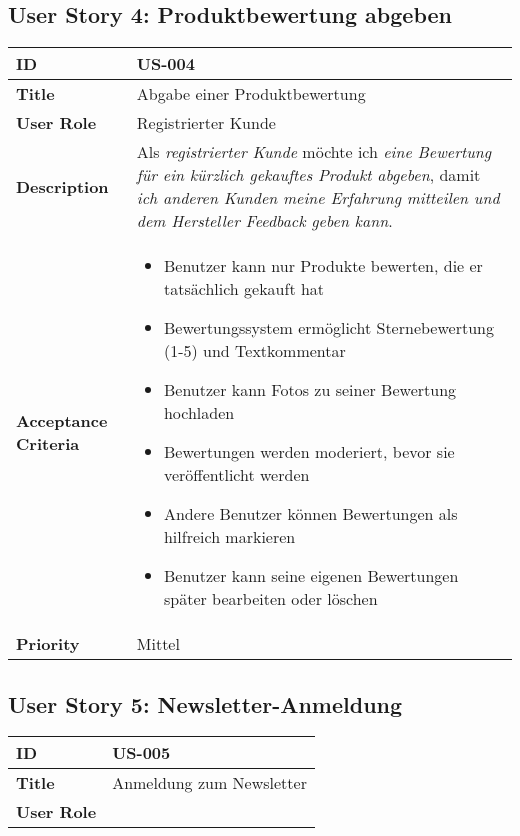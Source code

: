 \documentclass[a4paper,11pt]{article}
\begin{document}
\subsection{User Story 4: Produktbewertung abgeben}
\begin{tabularx}{\textwidth}{|l|X|}
    \hline
    \textbf{ID} & US-004 \\
    \hline
    \textbf{Title} & Abgabe einer Produktbewertung \\
    \hline
    \textbf{User Role} & Registrierter Kunde \\
    \hline
    \textbf{Description} & Als \textit{registrierter Kunde} möchte ich \textit{eine Bewertung für ein kürzlich gekauftes Produkt abgeben}, damit \textit{ich anderen Kunden meine Erfahrung mitteilen und dem Hersteller Feedback geben kann}. \\
    \hline
    \textbf{Acceptance Criteria} & 
    \begin{itemize}
        \item Benutzer kann nur Produkte bewerten, die er tatsächlich gekauft hat
        \item Bewertungssystem ermöglicht Sternebewertung (1-5) und Textkommentar
        \item Benutzer kann Fotos zu seiner Bewertung hochladen
        \item Bewertungen werden moderiert, bevor sie veröffentlicht werden
        \item Andere Benutzer können Bewertungen als hilfreich markieren
        \item Benutzer kann seine eigenen Bewertungen später bearbeiten oder löschen
    \end{itemize} \\
    \hline
    \textbf{Priority} & Mittel \\
    \hline
\end{tabularx}

\subsection{User Story 5: Newsletter-Anmeldung}
\begin{tabularx}{\textwidth}{|l|X|}
    \hline
    \textbf{ID} & US-005 \\
    \hline
    \textbf{Title} & Anmeldung zum Newsletter \\
    \hline
    \textbf{User Role}
\end{tabularx}
\end{document}
